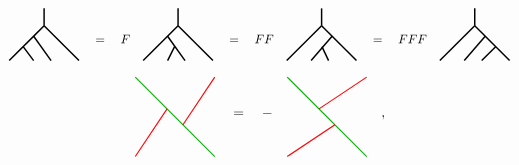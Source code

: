 \documentclass[report,paper=a4, fontsize=12pt, line_length=16cm, number_of_lines=33,dvipdfmx]{jlreq}
\numberwithin{equation}{chapter}
\begin{document}
\begin{align}
    \begin{tikzpicture}[baseline=0]
        \draw[very thick](0.5,0.5)--(-0.5,-0.5);
        \draw[very thick](-0.1, -0.1)--(0.2,-0.5);
        \draw[very thick](0.2, 0.2)--(0.7,-0.5);
        \draw[very thick](0.5,0.5)--(1.5,-0.5);
        \draw[very thick](0.5,0.5)--(0.5,1);
    \end{tikzpicture}
    \quad = \quad
    F
    \quad
    \begin{tikzpicture}[baseline=0]
        \draw[very thick](0.5,0.5)--(-0.5,-0.5);
        \draw[very thick](0.4, -0.1)--(0.2,-0.5);
        \draw[very thick](0.2, 0.2)--(0.7,-0.5);
        \draw[very thick](0.5,0.5)--(1.5,-0.5);
        \draw[very thick](0.5,0.5)--(0.5,1);
    \end{tikzpicture}
    \quad = \quad
    FF\quad
    \begin{tikzpicture}[baseline=0]
        \draw[very thick](0.5,0.5)--(-0.5,-0.5);
        \draw[very thick](0.8, 0.2)--(0.2,-0.5);
        \draw[very thick](0.51, -0.1)--(0.7,-0.5);
        \draw[very thick](0.5,0.5)--(1.5,-0.5);
        \draw[very thick](0.5,0.5)--(0.5,1);
    \end{tikzpicture}
    \quad = \quad
    FFF\quad
    \begin{tikzpicture}[baseline=0]
        \draw[very thick](0.5,0.5)--(-0.5,-0.5);
        \draw[very thick](0.8, 0.2)--(0.2,-0.5);
        \draw[very thick](1.1, -0.1)--(0.7,-0.5);
        \draw[very thick](0.5,0.5)--(1.5,-0.5);
        \draw[very thick](0.5,0.5)--(0.5,1);
    \end{tikzpicture}
\end{align}

\begin{align}
    \begin{tikzpicture}[baseline=0]
        \coordinate(A) at (-1,-1);
        \coordinate(B) at (1,-1);
        \coordinate(C) at (1,1);
        \coordinate(D) at (-1,1);
        \draw[darkgreen,thick](D)--(B);
        \draw[red,thick](A)--(-0.2,0.2);
        \draw[red,thick](C)--(0.2,-0.2);
    \end{tikzpicture} 
    \quad=\quad - \quad
    \begin{tikzpicture}[baseline=0]
        \coordinate(A) at (-1,-1);
        \coordinate(B) at (1,-1);
        \coordinate(C) at (1,1);
        \coordinate(D) at (-1,1);
        \draw[darkgreen,thick](D)--(B);
        \draw[red,thick](A)--(0.2,-0.2);
        \draw[red,thick](C)--(-0.2,0.2);
    \end{tikzpicture} \quad ,
\end{align}
\end{document}
